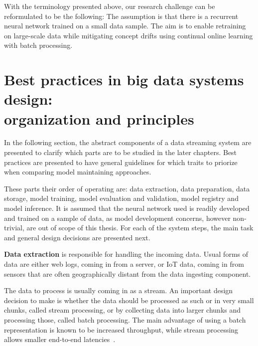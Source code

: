 With the terminology presented above, our research challenge can be reformulated to be the following: The assumption is that there is a recurrent neural network trained on a small data sample. The aim is to enable retraining on large-scale data while mitigating concept drifts using continual online learning with batch processing. 



\section[Best practices in big data systems design: organization and principles]{Best practices in big data systems design:\\ organization and principles}

In the following section, the abstract components of a data streaming system are presented to clarify which parts are to be studied in the later chapters. Best practices are presented to have general guidelines for which traits to priorize when comparing model maintaining approaches.

These parts their order of operating are: data extraction, data preparation, data storage, model training, model evaluation and validation, model registry and model inference. It is assumed that the neural network used is readily developed and trained on a sample of data, as model development concerns, however non-trivial, are out of scope of this thesis. For each of the system steps, the main task and general design decisions are presented next.

\textbf{Data extraction} is responsible for handling the incoming data. Usual forms of data are either web logs, coming in from a server, or IoT data, coming in from sensors that are often geographically distant from the data ingesting component.

The data to process is usually coming in as a stream. An important design decision to make is whether the data should be processed as such or in very small chunks, called stream processing, or by collecting data into larger chunks and processing those, called batch processing. The main advantage of using a batch representation is known to be increased throughput, while stream processing allows smaller end-to-end latencies~\cite{mci/Feick2018}. 

